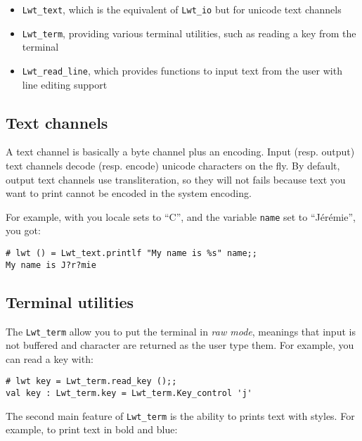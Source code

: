 \begin{itemize}
\item  {\tt Lwt\_text}, which is the equivalent of {\tt Lwt\_io}
but for unicode text channels
\item  {\tt Lwt\_term}, providing various terminal utilities, such as
reading a key from the terminal
\item  {\tt Lwt\_read\_line}, which provides functions to input text
from the user with line editing support

\end{itemize}

\subsection{ Text channels }

A text channel is basically a byte channel plus an encoding. Input
(resp. output) text channels decode (resp. encode) unicode characters
on the fly. By default, output text channels use transliteration, so
they will not fails because text you want to print cannot be encoded
in the system encoding.



For example, with you locale sets to ``C'', and the variable
{\tt name} set to ``Jérémie'', you got:



\lstset{language=[Objective]Caml}\begin{lstlisting}
# lwt () = Lwt_text.printlf "My name is %s" name;;
My name is J?r?mie

\end{lstlisting}
\subsection{ Terminal utilities }

The {\tt Lwt\_term} allow you to put the terminal in \emph{raw mode},
meanings that input is not buffered and character are
returned as the user type them. For example, you can read a key with:



\lstset{language=[Objective]Caml}\begin{lstlisting}
# lwt key = Lwt_term.read_key ();;
val key : Lwt_term.key = Lwt_term.Key_control 'j'

\end{lstlisting}
The second main feature of {\tt Lwt\_term} is the ability to prints
text with styles. For example, to print text in bold and blue:



